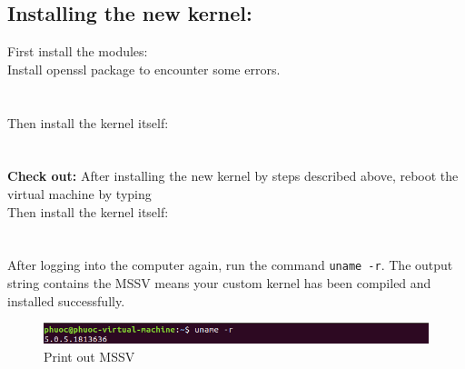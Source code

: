 \documentclass[a4paper]{article}
\begin{document}
\subsection{Installing the new kernel:}
First install the modules:\\
Install openssl package to encounter some errors. \\
\noindent{}\\
\\
Then install the kernel itself:\\
\noindent{}\\
\\
\textbf{Check out:} After installing the new kernel by steps described above, reboot the virtual machine by typing\\
Then install the kernel itself:\\
\noindent{}\\
\\
After logging into the computer again, run the command \texttt{uname -r}. The output string contains the MSSV means your custom kernel has been compiled and installed successfully.
\begin{figure}[h!]
\begin{center}
\includegraphics[width=14cm]{3.png}
\caption{Print out MSSV}
\end{center}
\end{figure}
\end{document}
